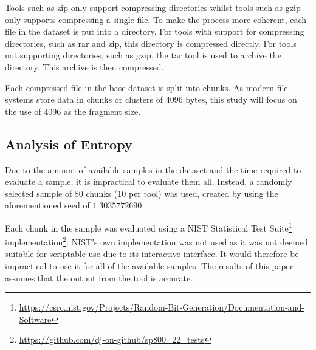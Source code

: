 \documentclass[conference]{IEEEtran}
\begin{document}
Tools such as zip only support compressing directories whilst tools such as gzip only supports compressing a single file. To make the process more coherent, each file in the dataset is put into a directory. For tools with support for compressing directories, such as rar and zip, this directory is compressed directly. For tools not supporting directories, such as gzip, the tar tool is used to archive the directory. This archive is then compressed.

Each compressed file in the base dataset is split into chunks. As modern file systems store data in chunks or clusters of 4096 bytes\cite{PENROSE2013}, this study will focus on the use of 4096 as the fragment size.


\subsection{Analysis of Entropy}
\label{method:entropy}

Due to the amount of available samples in the dataset and the time required to evaluate a sample, it is impractical to evaluate them all. Instead, a randomly selected sample of 80 chunks (10 per tool) was used, created by using the aforementioned seed of $1.3035772690$

Each chunk in the sample was evaluated using a NIST Statistical Test Suite\footnote{\href{https://csrc.nist.gov/Projects/Random-Bit-Generation/Documentation-and-Software}{https://csrc.nist.gov/Projects/Random-Bit-Generation/Documentation-and-Software}} implementation\footnote{\href{https://github.com/dj-on-github/sp800_22_tests}{https://github.com/dj-on-github/sp800\_22\_tests}}. NIST's own implementation was not used as it was not deemed suitable for scriptable use due to its interactive interface. It would therefore be impractical to use it for all of the available samples. The results of this paper assumes that the output from the tool is accurate.
\end{document}
